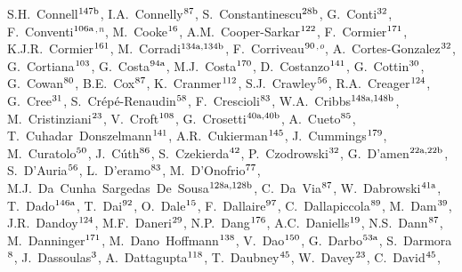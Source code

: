 \begin{flushleft}
S.H.~Connell$^\textrm{\scriptsize 147b}$,
I.A.~Connelly$^\textrm{\scriptsize 87}$,
S.~Constantinescu$^\textrm{\scriptsize 28b}$,
G.~Conti$^\textrm{\scriptsize 32}$,
F.~Conventi$^\textrm{\scriptsize 106a}$$^{,n}$,
M.~Cooke$^\textrm{\scriptsize 16}$,
A.M.~Cooper-Sarkar$^\textrm{\scriptsize 122}$,
F.~Cormier$^\textrm{\scriptsize 171}$,
K.J.R.~Cormier$^\textrm{\scriptsize 161}$,
M.~Corradi$^\textrm{\scriptsize 134a,134b}$,
F.~Corriveau$^\textrm{\scriptsize 90}$$^{,o}$,
A.~Cortes-Gonzalez$^\textrm{\scriptsize 32}$,
G.~Cortiana$^\textrm{\scriptsize 103}$,
G.~Costa$^\textrm{\scriptsize 94a}$,
M.J.~Costa$^\textrm{\scriptsize 170}$,
D.~Costanzo$^\textrm{\scriptsize 141}$,
G.~Cottin$^\textrm{\scriptsize 30}$,
G.~Cowan$^\textrm{\scriptsize 80}$,
B.E.~Cox$^\textrm{\scriptsize 87}$,
K.~Cranmer$^\textrm{\scriptsize 112}$,
S.J.~Crawley$^\textrm{\scriptsize 56}$,
R.A.~Creager$^\textrm{\scriptsize 124}$,
G.~Cree$^\textrm{\scriptsize 31}$,
S.~Cr\'ep\'e-Renaudin$^\textrm{\scriptsize 58}$,
F.~Crescioli$^\textrm{\scriptsize 83}$,
W.A.~Cribbs$^\textrm{\scriptsize 148a,148b}$,
M.~Cristinziani$^\textrm{\scriptsize 23}$,
V.~Croft$^\textrm{\scriptsize 108}$,
G.~Crosetti$^\textrm{\scriptsize 40a,40b}$,
A.~Cueto$^\textrm{\scriptsize 85}$,
T.~Cuhadar~Donszelmann$^\textrm{\scriptsize 141}$,
A.R.~Cukierman$^\textrm{\scriptsize 145}$,
J.~Cummings$^\textrm{\scriptsize 179}$,
M.~Curatolo$^\textrm{\scriptsize 50}$,
J.~C\'uth$^\textrm{\scriptsize 86}$,
S.~Czekierda$^\textrm{\scriptsize 42}$,
P.~Czodrowski$^\textrm{\scriptsize 32}$,
G.~D'amen$^\textrm{\scriptsize 22a,22b}$,
S.~D'Auria$^\textrm{\scriptsize 56}$,
L.~D'eramo$^\textrm{\scriptsize 83}$,
M.~D'Onofrio$^\textrm{\scriptsize 77}$,
M.J.~Da~Cunha~Sargedas~De~Sousa$^\textrm{\scriptsize 128a,128b}$,
C.~Da~Via$^\textrm{\scriptsize 87}$,
W.~Dabrowski$^\textrm{\scriptsize 41a}$,
T.~Dado$^\textrm{\scriptsize 146a}$,
T.~Dai$^\textrm{\scriptsize 92}$,
O.~Dale$^\textrm{\scriptsize 15}$,
F.~Dallaire$^\textrm{\scriptsize 97}$,
C.~Dallapiccola$^\textrm{\scriptsize 89}$,
M.~Dam$^\textrm{\scriptsize 39}$,
J.R.~Dandoy$^\textrm{\scriptsize 124}$,
M.F.~Daneri$^\textrm{\scriptsize 29}$,
N.P.~Dang$^\textrm{\scriptsize 176}$,
A.C.~Daniells$^\textrm{\scriptsize 19}$,
N.S.~Dann$^\textrm{\scriptsize 87}$,
M.~Danninger$^\textrm{\scriptsize 171}$,
M.~Dano~Hoffmann$^\textrm{\scriptsize 138}$,
V.~Dao$^\textrm{\scriptsize 150}$,
G.~Darbo$^\textrm{\scriptsize 53a}$,
S.~Darmora$^\textrm{\scriptsize 8}$,
J.~Dassoulas$^\textrm{\scriptsize 3}$,
A.~Dattagupta$^\textrm{\scriptsize 118}$,
T.~Daubney$^\textrm{\scriptsize 45}$,
W.~Davey$^\textrm{\scriptsize 23}$,
C.~David$^\textrm{\scriptsize 45}$,

\end{flushleft}
